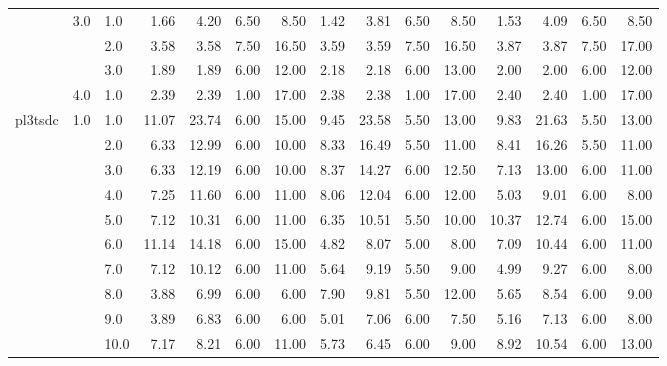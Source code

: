 \begin{tabular}{lllrrrrrrrrrrrr}
        & 3.0 & 1.0  &       1.66 &      4.20 & 6.50 &   8.50 &       1.42 &      3.81 & 6.50 &   8.50 &       1.53 &      4.09 & 6.50 &   8.50 \\
        &     & 2.0  &       3.58 &      3.58 & 7.50 &  16.50 &       3.59 &      3.59 & 7.50 &  16.50 &       3.87 &      3.87 & 7.50 &  17.00 \\
        &     & 3.0  &       1.89 &      1.89 & 6.00 &  12.00 &       2.18 &      2.18 & 6.00 &  13.00 &       2.00 &      2.00 & 6.00 &  12.00 \\
        & 4.0 & 1.0  &       2.39 &      2.39 & 1.00 &  17.00 &       2.38 &      2.38 & 1.00 &  17.00 &       2.40 &      2.40 & 1.00 &  17.00 \\
pl3tsdc & 1.0 & 1.0  &      11.07 &     23.74 & 6.00 &  15.00 &       9.45 &     23.58 & 5.50 &  13.00 &       9.83 &     21.63 & 5.50 &  13.00 \\
        &     & 2.0  &       6.33 &     12.99 & 6.00 &  10.00 &       8.33 &     16.49 & 5.50 &  11.00 &       8.41 &     16.26 & 5.50 &  11.00 \\
        &     & 3.0  &       6.33 &     12.19 & 6.00 &  10.00 &       8.37 &     14.27 & 6.00 &  12.50 &       7.13 &     13.00 & 6.00 &  11.00 \\
        &     & 4.0  &       7.25 &     11.60 & 6.00 &  11.00 &       8.06 &     12.04 & 6.00 &  12.00 &       5.03 &      9.01 & 6.00 &   8.00 \\
        &     & 5.0  &       7.12 &     10.31 & 6.00 &  11.00 &       6.35 &     10.51 & 5.50 &  10.00 &      10.37 &     12.74 & 6.00 &  15.00 \\
        &     & 6.0  &      11.14 &     14.18 & 6.00 &  15.00 &       4.82 &      8.07 & 5.00 &   8.00 &       7.09 &     10.44 & 6.00 &  11.00 \\
        &     & 7.0  &       7.12 &     10.12 & 6.00 &  11.00 &       5.64 &      9.19 & 5.50 &   9.00 &       4.99 &      9.27 & 6.00 &   8.00 \\
        &     & 8.0  &       3.88 &      6.99 & 6.00 &   6.00 &       7.90 &      9.81 & 5.50 &  12.00 &       5.65 &      8.54 & 6.00 &   9.00 \\
        &     & 9.0  &       3.89 &      6.83 & 6.00 &   6.00 &       5.01 &      7.06 & 6.00 &   7.50 &       5.16 &      7.13 & 6.00 &   8.00 \\
        &     & 10.0 &       7.17 &      8.21 & 6.00 &  11.00 &       5.73 &      6.45 & 6.00 &   9.00 &       8.92 &     10.54 & 6.00 &  13.00 \\

\end{tabular}

